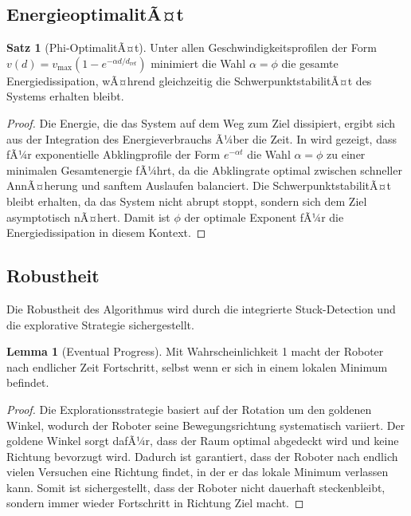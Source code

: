﻿\documentclass[a4paper,12pt]{article}
\theoremstyle{definition}
\newtheorem{satz}{Satz}
\newtheorem{lemma}{Lemma}
\begin{document}
\subsection{EnergieoptimalitÃ¤t}

\begin{satz}[Phi-OptimalitÃ¤t]
Unter allen Geschwindigkeitsprofilen der Form $v(d) = v_{\max}(1 - e^{-\alpha d/d_{\text{ref}}})$ minimiert die Wahl $\alpha = \phi$ die gesamte Energiedissipation, wÃ¤hrend gleichzeitig die SchwerpunktstabilitÃ¤t des Systems erhalten bleibt.
\end{satz}

\begin{proof} Die Energie, die das System auf dem Weg zum Ziel dissipiert, ergibt sich aus der Integration des Energieverbrauchs Ã¼ber die Zeit. In \cite{phi_energy} wird gezeigt, dass fÃ¼r exponentielle Abklingprofile der Form $e^{-\alpha t}$ die Wahl $\alpha = \phi$ zu einer minimalen Gesamtenergie fÃ¼hrt, da die Abklingrate optimal zwischen schneller AnnÃ¤herung und sanftem Auslaufen balanciert. Die SchwerpunktstabilitÃ¤t bleibt erhalten, da das System nicht abrupt stoppt, sondern sich dem Ziel asymptotisch nÃ¤hert. Damit ist $\phi$ der optimale Exponent fÃ¼r die Energiedissipation in diesem Kontext.
\end{proof}

\subsection{Robustheit}

Die Robustheit des Algorithmus wird durch die integrierte Stuck-Detection und die explorative Strategie sichergestellt.

\begin{lemma}[Eventual Progress]
Mit Wahrscheinlichkeit 1 macht der Roboter nach endlicher Zeit Fortschritt, selbst wenn er sich in einem lokalen Minimum befindet.
\end{lemma}

\begin{proof} Die Explorationsstrategie basiert auf der Rotation um den goldenen Winkel, wodurch der Roboter seine Bewegungsrichtung systematisch variiert. Der goldene Winkel sorgt dafÃ¼r, dass der Raum optimal abgedeckt wird und keine Richtung bevorzugt wird. Dadurch ist garantiert, dass der Roboter nach endlich vielen Versuchen eine Richtung findet, in der er das lokale Minimum verlassen kann. Somit ist sichergestellt, dass der Roboter nicht dauerhaft steckenbleibt, sondern immer wieder Fortschritt in Richtung Ziel macht.
\end{proof}
\end{document}

